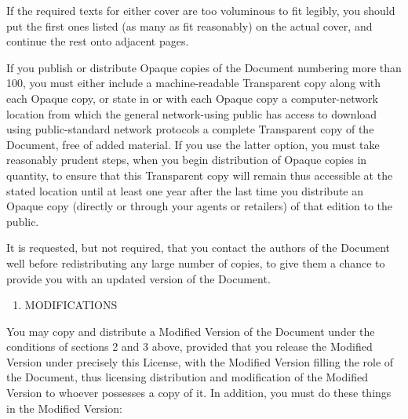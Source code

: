 \documentclass[12pt,a4paperpaper,]{report}
\providecommand{\tightlist}{%
  \setlength{\itemsep}{0pt}\setlength{\parskip}{0pt}}
\begin{document}
If the required texts for either cover are too voluminous to fit
legibly, you should put the first ones listed (as many as fit
reasonably) on the actual cover, and continue the rest onto adjacent
pages.

If you publish or distribute Opaque copies of the Document numbering
more than 100, you must either include a machine-readable Transparent
copy along with each Opaque copy, or state in or with each Opaque copy a
computer-network location from which the general network-using public
has access to download using public-standard network protocols a
complete Transparent copy of the Document, free of added material. If
you use the latter option, you must take reasonably prudent steps, when
you begin distribution of Opaque copies in quantity, to ensure that this
Transparent copy will remain thus accessible at the stated location
until at least one year after the last time you distribute an Opaque
copy (directly or through your agents or retailers) of that edition to
the public.

It is requested, but not required, that you contact the authors of the
Document well before redistributing any large number of copies, to give
them a chance to provide you with an updated version of the Document.

\begin{enumerate}
\def\labelenumi{\arabic{enumi}.}
\setcounter{enumi}{3}
\tightlist
\item
  MODIFICATIONS
\end{enumerate}

You may copy and distribute a Modified Version of the Document under the
conditions of sections 2 and 3 above, provided that you release the
Modified Version under precisely this License, with the Modified Version
filling the role of the Document, thus licensing distribution and
modification of the Modified Version to whoever possesses a copy of it.
In addition, you must do these things in the Modified Version:
\end{document}
